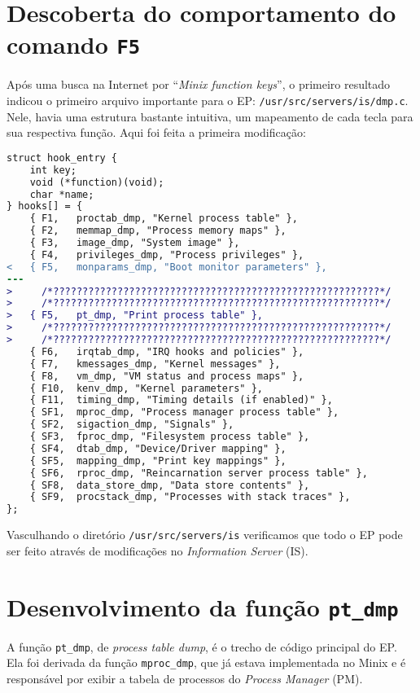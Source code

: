 \documentclass[brazil, a4paper]{scrartcl}
\begin{document}
\section{Descoberta do comportamento do comando \texttt{F5}}
Após uma busca na Internet por ``\emph{Minix function keys}'', o primeiro
resultado indicou o primeiro arquivo importante para o EP: 
\texttt{/usr/src/servers/is/dmp.c}. Nele, havia uma estrutura bastante
intuitiva, um mapeamento de cada tecla para sua respectiva função. Aqui foi
feita a primeira modificação:

\begin{lstlisting}[language=diff]
struct hook_entry {
	int key;
	void (*function)(void);
	char *name;
} hooks[] = {
	{ F1, 	proctab_dmp, "Kernel process table" },
	{ F2,   memmap_dmp, "Process memory maps" },
	{ F3,	image_dmp, "System image" },
	{ F4,	privileges_dmp, "Process privileges" },
< 	{ F5,	monparams_dmp, "Boot monitor parameters" },
---
>     /*????????????????????????????????????????????????????????*/
>     /*????????????????????????????????????????????????????????*/
> 	{ F5,	pt_dmp, "Print process table" },
>     /*????????????????????????????????????????????????????????*/
>     /*????????????????????????????????????????????????????????*/
	{ F6,	irqtab_dmp, "IRQ hooks and policies" },
	{ F7,	kmessages_dmp, "Kernel messages" },
	{ F8,	vm_dmp, "VM status and process maps" },
	{ F10,	kenv_dmp, "Kernel parameters" },
	{ F11,	timing_dmp, "Timing details (if enabled)" },
	{ SF1,	mproc_dmp, "Process manager process table" },
	{ SF2,	sigaction_dmp, "Signals" },
	{ SF3,	fproc_dmp, "Filesystem process table" },
	{ SF4,	dtab_dmp, "Device/Driver mapping" },
	{ SF5,	mapping_dmp, "Print key mappings" },
	{ SF6,	rproc_dmp, "Reincarnation server process table" },
	{ SF8,  data_store_dmp, "Data store contents" },
	{ SF9,  procstack_dmp, "Processes with stack traces" },
};
\end{lstlisting}

Vasculhando o diretório \texttt{/usr/src/servers/is} verificamos que todo o EP
pode ser feito através de modificações no \emph{Information Server} (IS).

\section{Desenvolvimento da função \texttt{pt\_dmp}}
A função \texttt{pt\_dmp}, de \emph{process table dump}, é o trecho de código
principal do EP. Ela foi derivada da função \texttt{mproc\_dmp}, que já estava
implementada no Minix e é responsável por exibir a tabela de processos do
\emph{Process Manager} (PM).
\end{document}

